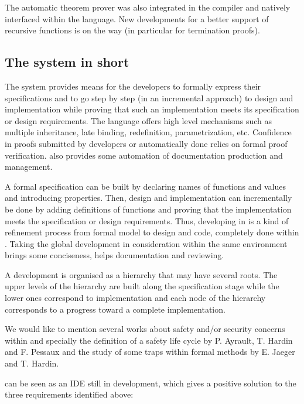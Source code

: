 The {\zenon} automatic theorem prover was also integrated in the
compiler and natively interfaced within the {\focalize} language. New
developments for a better support of recursive functions is on the way (in particular for
termination proofs).



\subsection*{The {\focalize} system in short}

The {\focalize} system provides means for the developers to formally express
their specifications and to go step by step (in an incremental approach) to
design and implementation while proving that such an implementation
meets its specification or design requirements. The {\focalize} language offers
high level mechanisms such as multiple inheritance, late binding, redefinition,
parametrization, etc.  Confidence in proofs submitted by developers or
automatically done relies on formal proof verification. {\focalize} also
provides some automation of documentation production and management.

A formal specification can be built by declaring names of functions
and values and introducing
properties. Then, design and implementation can incrementally be done
by adding definitions of functions and proving that the implementation
meets the specification or design requirements. Thus, developing in
{\focalize} is a kind of refinement process from  formal model to design
and code, completely done within {\focalize}. Taking the global development
in consideration within the same environment brings some conciseness,
helps documentation and reviewing.

A {\focalize} development is organised as a hierarchy that may have
several roots. The upper levels of the hierarchy are built along the
specification stage while the lower ones correspond to
implementation and each  node of the hierarchy corresponds to a progress
toward a complete implementation.

We would like to mention several works about safety and/or security
concerns within {\focalize} and specially the definition of a safety life
cycle by P. Ayrault, T. Hardin and F. Pessaux \cite{TTSS08} and the
study of some traps within formal methods by E. Jaeger and
T. Hardin\cite{traps}.

{\focalize} can be seen as an IDE still in development, which
gives a positive solution to the three requirements identified above:

